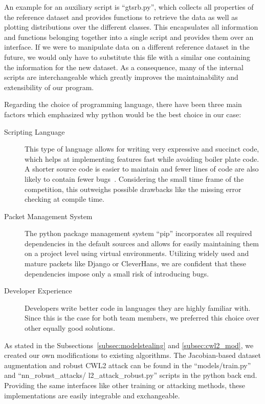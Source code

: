 An example for an auxiliary script is \enquote{gtsrb.py}, which collects all properties of the reference dataset and provides functions to retrieve the data as well as plotting distributions over the different classes.
This encapsulates all information and functions belonging together into a single script and provides them over an interface.
If we were to manipulate data on a different reference dataset in the future, we would only have to substitute this file with a similar one containing the information for the new dataset.
As a consequence, many of the internal scripts are interchangeable which greatly improves the maintainability and extensibility of our program.

Regarding the choice of programming language, there have been three main factors which emphasized why python would be the best choice in our case:
\begin{description}
	\item[Scripting Language] This type of language allows for writing very expressive and succinct code, which helps at implementing features fast while avoiding boiler plate code. 
	A shorter source code is easier to maintain and fewer lines of code are also likely to contain fewer bugs~\cite{jain2017clairvoyant}. 
	Considering the small time frame of the competition, this outweighs possible drawbacks like the missing error checking at compile time.
	\item[Packet Management System] The python package management system \enquote{pip} incorporates all required dependencies in the default sources and allows for easily maintaining them on a project level using virtual environments. 
	Utilizing widely used  and mature packets like Django or CleverHans, we are confident that these dependencies impose only a small risk of introducing bugs.
	\item[Developer Experience] Developers write better code in languages they are highly familiar with.
	Since this is the case for both team members, we preferred this choice over other equally good solutions.
\end{description}

As stated in the Subsections~\ref{subsec:modelstealing} and \ref{subsec:cwl2_mod}, we created our own modifications to existing algorithms.
The Jacobian-based dataset augmentation and robust CWL2 attack can be found in the \enquote{models/train.py} and \enquote{nn\_robust\_attacks/ l2\_attack\_robust.py} scripts in the python back end.
Providing the same interfaces like other training or attacking methods, these implementations are easily integrable and exchangeable.

